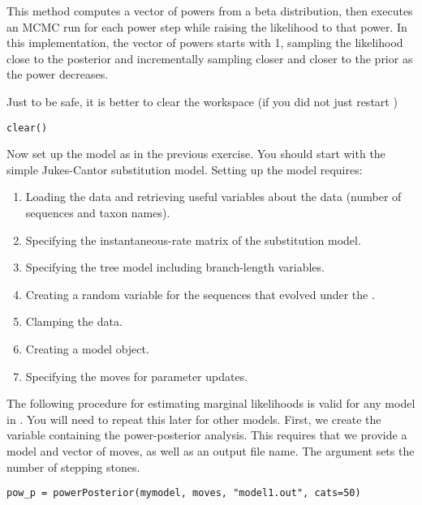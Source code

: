 This method computes a vector of powers from a beta distribution, then executes an MCMC run for each power step while raising the likelihood to that power. In this implementation, the vector of powers starts with 1, sampling the likelihood close to the posterior and incrementally sampling closer and closer to the prior as the power decreases. 




Just to be safe, it is better to clear the workspace (if you did not just restart \RevBayes)
{\tt \begin{snugshade*}
\begin{lstlisting}
clear()
\end{lstlisting}
\end{snugshade*}}

Now set up the model as in the previous exercise. You should start with the simple Jukes-Cantor substitution model. 
Setting up the model requires:
\begin{enumerate}
\item Loading the data and retrieving useful variables about the data (\EG number of sequences and taxon names).
\item Specifying the instantaneous-rate matrix of the substitution model.
\item Specifying the tree model including branch-length variables.
\item Creating a random variable for the sequences that evolved under the .
\item Clamping the data.
\item Creating a model object.
\item Specifying the moves for parameter updates.
\end{enumerate}

The following procedure for estimating marginal likelihoods is valid for any model in \RevBayes.
You will need to repeat this later for other models.
First, we create the variable containing the power-posterior analysis. 
This requires that we provide a model and vector of moves, as well as an output file name. 
The  argument sets the number of stepping stones.
{\tt \begin{snugshade*}
\begin{lstlisting}
pow_p = powerPosterior(mymodel, moves, "model1.out", cats=50) 
\end{lstlisting}
\end{snugshade*}}

